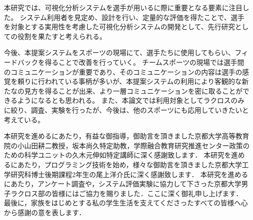 \documentclass[sotsuron]{kuee}
\begin{document}
	本研究では、可視化分析システムを選手が用いるに際に重要となる要素に注目した。
	システム利用者を見定め、設計を行い、定量的な評価を得たことで、選手を対象とする実用性を考慮した可視化分析システムの開発として、先行研究としての役割を果たすと考えられる。

	今後、本提案システムをスポーツの現場にて、選手たちに使用してもらい、フィードバックを得ることで改善を行っていく。
	チームスポーツの現場では選手間のコミュニケーションが重要であり、そのコミュニケーションの内容は選手の感覚を頼りに行われている事柄が多いが、本提案システムの利用により客観的な新たなの見方を得ることが出来、より一層コミュニケーションを密に取ることができるようになるとも思われる。
	また、本論文では利用対象としてラクロスのみに絞り、調査、実験を行ったが、今後は、他のスポーツにも応用していきたいと考えている。



\begin{acknowledgements}
	本研究を進めるにあたり，有益な御指導，御助言を頂きました京都大学高等教育院の小山田耕二教授，坂本尚久特定助教，学際融合教育研究推進センター政策のための科学ユニットの久木元伸如特定講師に深く感謝致します．
	本研究を進めるにあたり，プログラミング技術を始め，様々な御助言を頂きました京都大学工学研究科博士後期課程2年生の尾上洋介氏に深く感謝致します．
	本研究を進めるにあたり，アンケート調査や，システム評価実験に協力して下さった京都大学男子ラクロス部の皆様にはご協力を賜りました．ここに深く御礼申し上げます．
	最後に，家族をはじめとする私の学生生活を支えてくださったすべての皆様へ心から感謝の意を表します．
\end{acknowledgements}








\appendix
\end{document}

